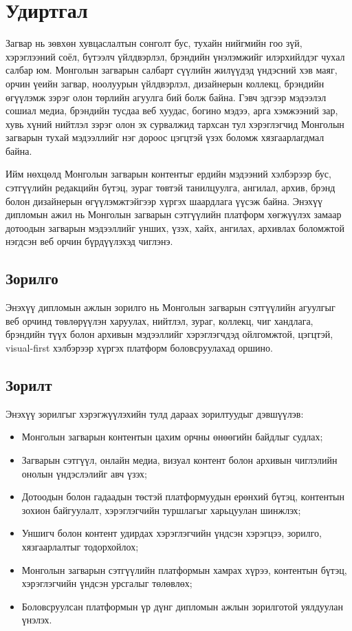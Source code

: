 
\chapter{Удиртгал}
\label{ChapterIntro}

Загвар нь зөвхөн хувцаслалтын сонголт бус, тухайн нийгмийн гоо зүй, хэрэглээний соёл, бүтээлч үйлдвэрлэл, брэндийн үнэлэмжийг илэрхийлдэг чухал салбар юм. Монголын загварын салбарт сүүлийн жилүүдэд үндэсний хэв маяг, орчин үеийн загвар, ноолуурын үйлдвэрлэл, дизайнерын коллекц, брэндийн өгүүлэмж зэрэг олон төрлийн агуулга бий болж байна. Гэвч эдгээр мэдээлэл сошиал медиа, брэндийн тусдаа веб хуудас, богино мэдээ, арга хэмжээний зар, хувь хүний нийтлэл зэрэг олон эх сурвалжид тархсан тул хэрэглэгчид Монголын загварын тухай мэдээллийг нэг дороос цэгцтэй үзэх боломж хязгаарлагдмал байна.

Ийм нөхцөлд Монголын загварын контентыг ердийн мэдээний хэлбэрээр бус, сэтгүүлийн редакцийн бүтэц, зураг төвтэй танилцуулга, ангилал, архив, брэнд болон дизайнерын өгүүлэмжтэйгээр хүргэх шаардлага үүсэж байна. Энэхүү дипломын ажил нь Монголын загварын сэтгүүлийн платформ хөгжүүлэх замаар дотоодын загварын мэдээллийг унших, үзэх, хайх, ангилах, архивлах боломжтой нэгдсэн веб орчин бүрдүүлэхэд чиглэнэ.

\section*{Зорилго}
Энэхүү дипломын ажлын зорилго нь Монголын загварын сэтгүүлийн агуулгыг веб орчинд төвлөрүүлэн харуулах, нийтлэл, зураг, коллекц, чиг хандлага, брэндийн түүх болон архивын мэдээллийг хэрэглэгчдэд ойлгомжтой, цэгцтэй, visual-first хэлбэрээр хүргэх платформ боловсруулахад оршино.

\section*{Зорилт}
Энэхүү зорилгыг хэрэгжүүлэхийн тулд дараах зорилтуудыг дэвшүүлэв:
\begin{itemize}
    \item Монголын загварын контентын цахим орчны өнөөгийн байдлыг судлах;
    \item Загварын сэтгүүл, онлайн медиа, визуал контент болон архивын чиглэлийн онолын үндэслэлийг авч үзэх;
    \item Дотоодын болон гадаадын төстэй платформуудын ерөнхий бүтэц, контентын зохион байгуулалт, хэрэглэгчийн туршлагыг харьцуулан шинжлэх;
    \item Уншигч болон контент удирдах хэрэглэгчийн үндсэн хэрэгцээ, зорилго, хязгаарлалтыг тодорхойлох;
    \item Монголын загварын сэтгүүлийн платформын хамрах хүрээ, контентын бүтэц, хэрэглэгчийн үндсэн урсгалыг төлөвлөх;
    \item Боловсруулсан платформын үр дүнг дипломын ажлын зорилготой уялдуулан үнэлэх.
\end{itemize}


